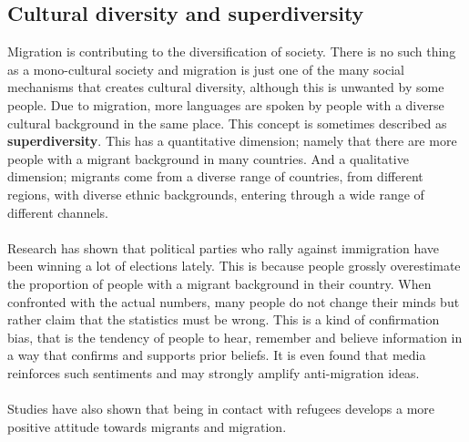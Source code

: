 \documentclass[../summary.tex]{subfiles}
\begin{document}
\subsection{Cultural diversity and superdiversity}
Migration is contributing to the diversification of society. There is no such thing as a mono-cultural society and migration is just one of the many social mechanisms that creates cultural diversity, although this is unwanted by some people. Due to migration, more languages are spoken by people with a diverse cultural background in the same place. This concept is sometimes described as \textbf{superdiversity}. This has a quantitative dimension; namely that there are more people with a migrant background in many countries. And a qualitative dimension; migrants come from a diverse range of countries, from different regions, with diverse ethnic backgrounds, entering through a wide range of different channels.
\\\\
Research has shown that political parties who rally against immigration have been winning a lot of elections lately. This is because people grossly overestimate the proportion of people with a migrant background in their country. When confronted with the actual numbers, many people do not change their minds but rather claim that the statistics must be wrong. This is a kind of confirmation bias, that is the tendency of people to hear, remember and believe information in a way that confirms and supports prior beliefs. It is even found that media reinforces such sentiments and may strongly amplify anti-migration ideas.
\\\\
Studies have also shown that being in contact with refugees develops a more positive attitude towards migrants and migration.
\end{document}
